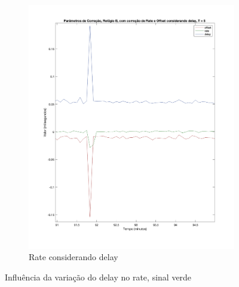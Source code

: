 \begin{figure}[h]
\begin{subfigure}{0.49\linewidth}
        \includegraphics[width=\linewidth]{figures/rate_vs_delay_caso2.png}
        \caption{Rate considerando delay}
        \label{fig:rate_vs_delay_caso2}
      \end{subfigure}
    
      \caption{Influência da variação do delay no rate, sinal verde}
    \end{figure}
    

